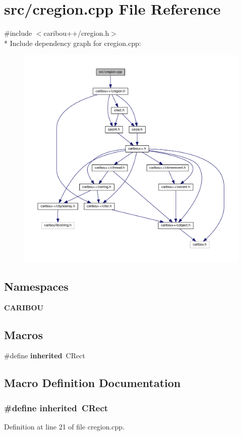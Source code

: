 \section{src/cregion.cpp File Reference}
\label{cregion_8cpp}
{\ttfamily \#include $<$caribou++/cregion.\+h$>$}\\*
Include dependency graph for cregion.\+cpp\+:
\nopagebreak
\begin{figure}[H]
\begin{center}
\leavevmode
\includegraphics[width=350pt]{cregion_8cpp__incl}
\end{center}
\end{figure}
\subsection*{Namespaces}
\begin{DoxyCompactItemize}
\item 
 {\bf C\+A\+R\+I\+B\+OU}
\end{DoxyCompactItemize}
\subsection*{Macros}
\begin{DoxyCompactItemize}
\item 
\#define {\bf inherited}~C\+Rect
\end{DoxyCompactItemize}


\subsection{Macro Definition Documentation}
\subsubsection[{inherited}]{\setlength{\rightskip}{0pt plus 5cm}\#define inherited~C\+Rect}\label{cregion_8cpp_a3920e3b7cb0909b941b2409493acf8f1}


Definition at line 21 of file cregion.\+cpp.


